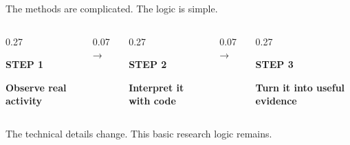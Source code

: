 \documentclass[aspectratio=169,11pt]{beamer}
\newcommand{\partlabel}[1]{%
  {\color{Navy}\fontsize{9}{11}\selectfont\bfseries\MakeUppercase{#1}\par}
}
\begin{document}
\begin{frame}{The methods are complicated. The logic is simple.}
  \vspace{0.55cm}
  \begin{columns}[c,onlytextwidth]
    \begin{column}{0.27\textwidth}
      \partlabel{Step 1}
      \vspace{0.22cm}
      {\color{Ink}\fontsize{16}{20}\selectfont\bfseries
        Observe real activity
      \par}
    \end{column}

    \begin{column}{0.07\textwidth}
      \centering
      {\color{Navy}\fontsize{18}{20}\selectfont →}
    \end{column}

    \begin{column}{0.27\textwidth}
      \partlabel{Step 2}
      \vspace{0.22cm}
      {\color{Ink}\fontsize{16}{20}\selectfont\bfseries
        Interpret it with code
      \par}
    \end{column}

    \begin{column}{0.07\textwidth}
      \centering
      {\color{Navy}\fontsize{18}{20}\selectfont →}
    \end{column}

    \begin{column}{0.27\textwidth}
      \partlabel{Step 3}
      \vspace{0.22cm}
      {\color{Ink}\fontsize{16}{20}\selectfont\bfseries
        Turn it into useful evidence
      \par}
    \end{column}
  \end{columns}

  \vfill
  {\color{Muted}\fontsize{10.5}{13.5}\selectfont
    The technical details change. This basic research logic remains.
  \par}
\end{frame}
\end{document}
